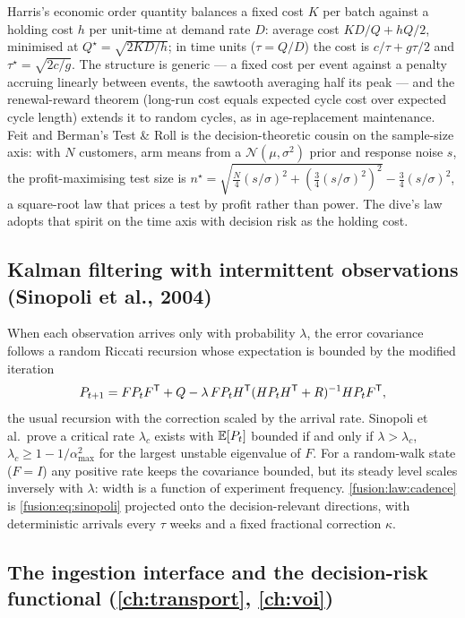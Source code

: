 Harris's economic order quantity balances a fixed cost $K$ per batch against a holding cost $h$ per unit-time at demand rate $D$: average cost $KD/Q + hQ/2$, minimised at $Q^\star = \sqrt{2KD/h}$; in time units ($\tau = Q/D$) the cost is $c/\tau + g\tau/2$ and $\tau^\star = \sqrt{2c/g}$. The structure is generic --- a fixed cost per event against a penalty accruing linearly between events, the sawtooth averaging half its peak --- and the renewal-reward theorem (long-run cost equals expected cycle cost over expected cycle length) extends it to random cycles, as in age-replacement maintenance. Feit and Berman's Test \& Roll is the decision-theoretic cousin on the sample-size axis: with $N$ customers, arm means from a $\mathcal N(\mu,\sigma^2)$ prior and response noise $s$, the profit-maximising test size is $n^\star = \sqrt{\tfrac N4(s/\sigma)^2 + (\tfrac34(s/\sigma)^2)^2} - \tfrac34(s/\sigma)^2$, a square-root law that prices a test by profit rather than power. The dive's law adopts that spirit on the time axis with decision risk as the holding cost.

\subsection{Kalman filtering with intermittent observations (Sinopoli et al., 2004)}

When each observation arrives only with probability $\lambda$, the error covariance follows a random Riccati recursion whose expectation is bounded by the modified iteration
\begin{equation}
P_{t+1} = FP_tF^{\mathsf{T}} + Q - \lambda\,FP_tH^{\mathsf{T}}(HP_tH^{\mathsf{T}} + R)^{-1}HP_tF^{\mathsf{T}},
\label{fusion:eq:sinopoli}
\end{equation}
the usual recursion with the correction scaled by the arrival rate. Sinopoli et al.\ prove a critical rate $\lambda_c$ exists with $\mathbb{E}[P_t]$ bounded if and only if $\lambda > \lambda_c$, $\lambda_c \ge 1 - 1/\alpha_{\max}^2$ for the largest unstable eigenvalue of $F$. For a random-walk state ($F = I$) any positive rate keeps the covariance bounded, but its steady level scales inversely with $\lambda$: width is a function of experiment frequency. \cref{fusion:law:cadence} is \cref{fusion:eq:sinopoli} projected onto the decision-relevant directions, with deterministic arrivals every $\tau$ weeks and a fixed fractional correction $\kappa$.

\subsection{The ingestion interface and the decision-risk functional (\cref{ch:transport}, \cref{ch:voi})}


